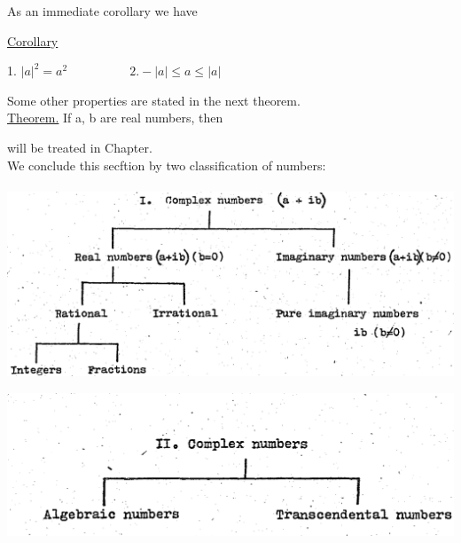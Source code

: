 \documentclass[11pt]{amsbook}
\begin{document}
	As an immediate corollary we have

	 \medskip

	\underline{Corollary}
	
	\medskip
	
	1. $|a|^2 = a^2 \quad \quad \quad \quad \quad 2. -|a| \leq a \leq |a| $
	
	\medskip

	Some other properties are stated in the next theorem. \\

	\underline{Theorem.} If a, b are real numbers, then 

will be treated in Chapter.\\

We conclude this secftion by two classification of numbers:\\\\

	\includegraphics[width=1\textwidth]{images/b1p1-015-fig01}

	\includegraphics[width=1\textwidth]{images/b1p1-015-fig02}\\
\end{document}
